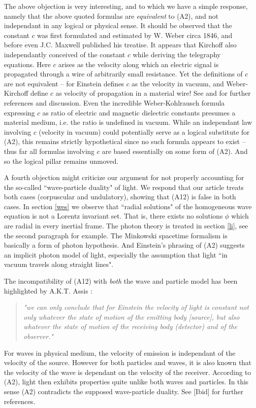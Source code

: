 \documentclass[12pt]{amsart}
\theoremstyle{definition}
\theoremstyle{remark}
\begin{document}
The above objection is very interesting, and to which we have a simple response, namely that the above quoted formulas are \emph{equivalent} to (A2), and not independant in any logical or physical sense. It should be observed that the constant $c$ was first formulated and estimated by W. Weber circa 1846, and before even J.C. Maxwell published his treatise. It appears that Kirchoff also independantly conceived of the constant $c$ while deriving the telegraphy equations. Here $c$ arises as the velocity along which an electric signal is propagated through a wire of arbitrarily small resistance. Yet the definitions of $c$ are not equivalent -- for Einstein defines $c$ as the velocity in vacuum, and Weber-Kirchoff define $c$ as velocity of propagation in a material wire! See \cite{assis1999meaning} and \cite{awk} for further references and discussion. Even the incredible Weber-Kohlrausch formula expressing $c$ as ratio of electric and magnetic dielectric constants presumes a material medium, i.e. the ratio is undefined in vacuum. While an independant law involving $c$ (velocity in vacuum) could potentially serve as a logical substitute for (A2), this remains strictly hypothetical since no such formula appears to exist -- thus far all formulas involving $c$ are based essentially on some form of (A2). And so the logical pillar remains unmoved. 

A fourth objection might criticize our argument for not properly accounting for the so-called ``wave-particle duality" of light. We respond that our article treats both cases (corpuscular and undulatory), showing that (A12) is false in both cases. In section \ref{wes} we observe that ``radial solutions" of the homogeneous wave equation is not a Lorentz invariant set. That is, there exists no solutions $\phi$ which are radial in every inertial frame. The photon theory is treated in section \ref{li}, see the second paragraph for example. The Minkowski spacetime formalism is basically a form of photon hypothesis. And Einstein's phrasing of (A2) suggests an implicit photon model  of light, especially the assumption that light ``in vacuum travels along straight lines". 

The incompatibility of (A12) with \emph{both} the wave and particle model has been highlighted by A.K.T. Assis \cite[\S 7.2.4, pp.133]{assis1999relational}:  
\begin{quote} \emph{"we can only conclude that for Einstein the velocity of light is constant not only whatever the state of motion of the emitting body [source], but also whatever the state of motion of the receiving body (detector) and of the observer."} 
\end{quote}
For waves in physical medium, the velocity of emission is independant of the velocity of the source. However for both particles and waves, it is also known that the velocity of the wave is dependant on the velocity of the receiver. According to (A2), light then exhibits properties quite unlike both waves and particles. In this sense (A2) contradicts the supposed wave-particle duality. See [Ibid] for further references. 
\end{document}
